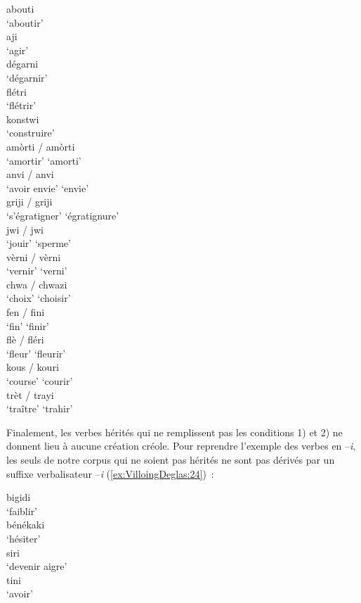 \documentclass[output=paper]{langsci/langscibook}
\begin{document}
\ea \label{ex:VilloingDeglas:21}
  \ea \gll abouti\\
  {`aboutir'}\\
  \ex \gll aji\\
  {`agir'}\\
  \ex \gll dégarni\\
  {`dégarnir'}\\
  \ex \gll flétri\\
  {`flétrir'}\\
  \ex \gll konstwi\\
  {`construire'}\\
  \z
\ex \label{ex:VilloingDeglas:22}
  \ea \gll amòrti / amòrti\\
  {`amortir'} {} {`amorti'}\\
  \ex \gll anvi / anvi\\
  {`avoir envie'} {} {`envie'}\\
  \ex \gll griji / griji\\
  {`s'égratigner'} {} {`égratignure'}\\
  \ex \gll jwi / jwi\\
  {`jouir'} {} {`sperme'}\\
  \ex \gll vèrni / vèrni\\
  {`vernir'} {} {`verni'}\\
  \z
\ex \label{ex:VilloingDeglas:23}
  \ea \gll chwa / chwazi\\
  {`choix'} {} {`choisir'}\\
  \ex \gll fen / fini\\
  {`fin'} {} {`finir'}\\
  \ex \gll flè / fléri\\
  {`fleur'} {} {`fleurir'}\\
  \ex \gll kous / kouri\\
  {`course'} {} {`courir'}\\
  \ex \gll trèt / trayi\\
  {`traître'} {} {`trahir'}\\
\z\z

Finalement, les verbes hérités qui ne remplissent pas les conditions 1)
et 2) ne donnent lieu à aucune création créole. Pour reprendre l'exemple
des verbes en --\emph{i}, les seuls de notre corpus qui ne soient pas
hérités ne sont pas dérivés par un suffixe verbalisateur --\emph{i}
(\ref{ex:VilloingDeglas:24})~:

\ea \label{ex:VilloingDeglas:24}
  \ea \gll bigidi\\
  {`faiblir'}\\
  \ex \gll bénékaki\\
  {`hésiter'}\\
  \ex \gll siri\\
  {`devenir aigre'}\\
  \ex \gll tini\\
  {`avoir'}\\
  \z
\z
\end{document}
